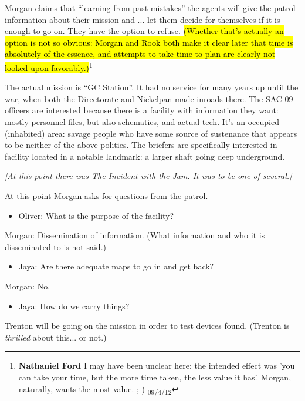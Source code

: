 Morgan claims that ``learning from past mistakes'' the agents will give the patrol information about their mission and ... let them decide for themselves if it is enough to go on.  They have the option to refuse.  \hl{(Whether that's actually an option is not so obvious: Morgan and Rook both make it clear later that time is absolutely of the essence, and attempts to take time to plan are clearly not looked upon favorably.)}\footnote{\textbf{Nathaniel Ford }I may have been unclear here; the intended effect was 'you can take your time, but the more time taken, the less value it has'. Morgan, naturally, wants the most value. ;-) \textsubscript{09/4/12 }}



The actual mission is ``GC Station''.  It had no service for many years up until the war, when both the Directorate and Nickelpan made inroads there.  The SAC-09 officers are interested because there is a facility with information they want: mostly personnel files, but also schematics, and actual tech.   It's an occupied (inhabited) area: savage people who have some source of sustenance that appears to be neither of the above polities.  The briefers are specifically interested in facility located in a notable landmark: a larger shaft going deep underground.



\textit{{[}At this point there was The Incident with the Jam.  It was to be one of several.{]}}



At this point Morgan asks for questions from the patrol.

\begin{itemize}
\item Oliver: What is the purpose of the facility?
\end{itemize}

Morgan: Dissemination of information.  (What information and who it is disseminated to is not said.)

\begin{itemize}
\item Jaya: Are there adequate maps to go in and get back?
\end{itemize}

Morgan: No.

\begin{itemize}
\item Jaya: How do we carry things?
\end{itemize}

Trenton will be going on the mission in order to test devices found.  (Trenton is\textit{ thrilled} about this... or not.)

